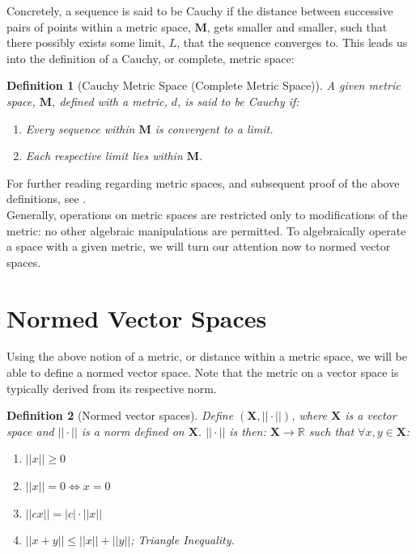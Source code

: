 \documentclass[12pt,a4paper]{report}
\theoremstyle{thms}
\theoremstyle{defns}
\newtheorem{definition}{Definition}[section]
\begin{document}
Concretely, a sequence is said to be Cauchy if the distance between successive pairs of points within a metric space, $\mathbf{M}$, gets smaller and smaller, such that there possibly exists some limit, $L$, that the sequence converges to. This leads us into the definition of a Cauchy, or complete, metric space:

\begin{definition}[Cauchy Metric Space (Complete Metric Space)]
    A given metric space, $\mathbf{M}$, defined with a metric, $d$, is said to be Cauchy if:

    \begin{enumerate}
        \item Every sequence within $\mathbf{M}$ is convergent to a limit.
        \item Each respective limit lies within $\mathbf{M}$.
    \end{enumerate}
\end{definition}

For further reading regarding metric spaces, and subsequent proof of the above definitions, see \cite{kaplansky_basic}.\\
Generally, operations on metric spaces are restricted only to modifications of the metric: no other algebraic manipulations are permitted. To algebraically operate a space with a given metric, we will turn our attention now to normed vector spaces.

\section{Normed Vector Spaces}

Using the above notion of a metric, or distance within a metric space, we will be able to define a normed vector space. Note that the metric on a vector space is typically derived from its respective norm.

\begin{definition}[Normed vector spaces]
    Define $(\mathbf{X}, ||\cdot||)$, where $\mathbf{X}$ is a vector space and $||\cdot||$ is a norm defined on $\mathbf{X}$. $||\cdot||$  is then:  $\mathbf{X} \rightarrow \mathbb{R}$ such that $\forall x, y \in  \mathbf{X}$:
    \begin{enumerate}
        \item $||x|| \geq 0$
        \item $||x|| = 0 \iff x = 0$
        \item $||cx|| = |c|\cdot||x||$
        \item $||x + y|| \leq ||x|| + ||y||$; Triangle Inequality.
    \end{enumerate}
\end{definition}
\end{document}
